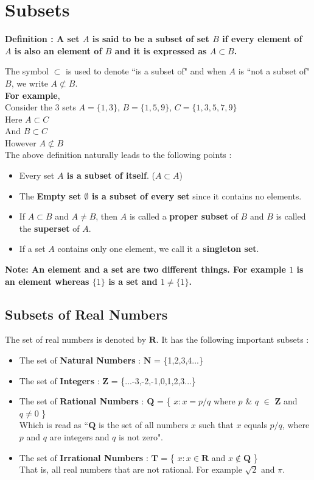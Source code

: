 \documentclass[12pt, letterpaper]{article}
\begin{document}
\section{Subsets}
\begin{displayquote}
\textbf{Definition : A set $A$ is said to be a subset of set $B$ if every element of $A$ is also an element of $B$ and it is expressed as $A \subset B$.}
\end{displayquote}
The symbol $\subset$ is used to denote ``is a subset of" and when $A$ is ``not a subset of" $B$, we write $A \not \subset B$.\\
\textbf{For example},\\ 
Consider the 3 sets $A = \{1,3\}$, $B = \{1,5,9\}$, $C = \{1,3,5,7,9\}$\\
Here $A \subset C$\\
And $B \subset C$\\
However $A \not \subset B$\\
The above definition naturally leads to the following points : 
\begin{itemize}
    \item Every set \textbf{$A$ is a subset of itself}. ($A \subset A$)
    \item The \textbf{Empty set $\emptyset$ is a subset of every set} since it contains no elements.
    \item If $A \subset B$ and $A \neq B$, then $A$ is called a \textbf{proper subset} of $B$ and $B$ is called the \textbf{superset} of $A$.
    \item If a set $A$ contains only one element, we call it a \textbf{singleton set}.
\end{itemize}
\begin{displayquote}
\textbf{Note: An element and a set are two different things. For example $1$ is an element whereas $\{1\}$ is a set and $1 \neq \{1\}$.}
\end{displayquote}

\subsection{Subsets of Real Numbers}
The set of real numbers is denoted by $\mathbf{R}$. It has the following important subsets : 
\begin{itemize}
    \item The set of \textbf{Natural Numbers} : $\mathbf{N}$ = \{1,2,3,4...\}
    \item The set of \textbf{Integers} : $\mathbf{Z}$ = \{...-3,-2,-1,0,1,2,3...\}
    \item The set of \textbf{Rational Numbers} : $\mathbf{Q}$ = \{ $x : x = p/q$ where $p$ \& $q$ $\in$ $\mathbf{Z}$ and $q \neq 0$ \}\\
    Which is read as ``$\mathbf{Q}$ is the set of all numbers $x$ such that $x$ equals $p/q$, where $p$ and $q$ are integers and $q$ is not zero". 
    \item The set of \textbf{Irrational Numbers} : $\mathbf{T}$ = \{ $x : x \in \mathbf{R}$ and $x \notin \mathbf{Q}$ \}\\
    That is, all real numbers that are not rational. For example $\sqrt{2}$ and $\pi$.  
\end{itemize}
\end{document}
